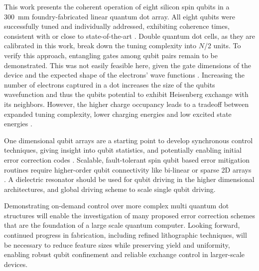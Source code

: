 \documentclass[superscriptaddress,twocolumn,10pt,prl,floatfix,nofootinbib,aps]{revtex4-2}
\newcommand{\change}[1]{%
\textcolor{reviewercolor}{\ignorespaces#1\unskip}%
}
\begin{document}
This work presents the coherent operation of eight silicon spin qubits in a \SI{300}{\milli \meter} foundry-fabricated linear quantum dot array. All eight qubits were successfully tuned and individually addressed, exhibiting coherence times, consistent with or close to state-of-the-art \cite{veldhorst_addressable_2014, steinacker_industry-compatible_2025}.
Double quantum dot cells, as they are calibrated in this work, break down the tuning complexity into $N$/2 units. To verify this approach, entangling gates among qubit pairs remain to be demonstrated. This was not easily feasible here, given the gate dimensions of the device and the expected shape of the electrons' wave functions \cite{cifuentes_bounds_2024}. Increasing the number of electrons captured in a dot increases the size of the qubits wavefunction \cite{leon_coherent_2020, leon_bell-state_2021} and thus the qubits potential to exhibit Heisenberg exchange with its neighbors. However, the higher charge occupancy leads to a tradeoff between expanded tuning complexity, lower charging energies and low excited state energies \cite{leon_coherent_2020, leon_bell-state_2021}.

One dimensional qubit arrays are a starting point to develop synchronous control techniques, giving insight into qubit statistics, and potentially enabling initial error correction codes \cite{jones_logical_2018}. Scalable, fault-tolerant spin qubit based error mitigation routines require higher-order qubit connectivity like bi-linear \cite{ha_two-dimensional_2025, siegel_towards_2024} or sparse 2D arrays \cite{boter_spiderweb_2022}.
\change{
    A dielectric resonator should be used for qubit driving in the higher dimensional architectures, \cite{vahapoglu_coherent_2022, vahapoglu_single-electron_2021} and global driving scheme \cite{hansen_implementation_2022, hansen_entangling_2024, seedhouse_quantum_2021} to scale single qubit driving.
    }
Demonstrating on-demand control over more complex multi quantum dot structures will enable the investigation of many proposed error correction schemes that are the foundation of a large scale quantum computer.
\change{
    Looking forward, continued progress in fabrication, including refined lithographic techniques, will be necessary to reduce feature sizes while preserving yield and uniformity, enabling robust qubit confinement and reliable exchange control in larger-scale devices.
}

\end{document}
